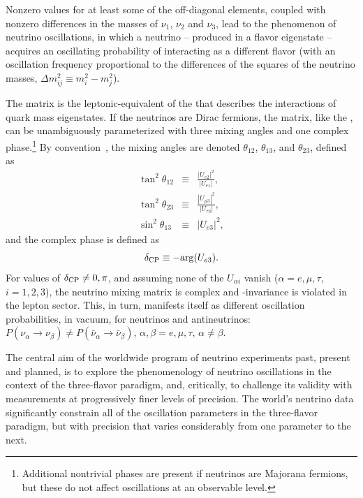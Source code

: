 Nonzero values for at least some of the off-diagonal elements, coupled with nonzero 
differences in the masses of $\nu_1$, $\nu_2$ and $\nu_3$, lead to the phenomenon of 
neutrino oscillations, in which a neutrino -- %
produced in a  
flavor eigenstate -- acquires an oscillating probability 
of interacting as a different flavor (with an oscillation frequency proportional to 
the differences of the squares of the neutrino masses, $\Delta m^2_{ij}\equiv m_i^2-m_j^2$). %


The  matrix is the leptonic-equivalent of the  %
that describes the  interactions of quark mass 
eigenstates. If the neutrinos are Dirac fermions, the  matrix, 
like the , can be unambiguously parameterized with three mixing 
angles and one complex phase.\footnote{Additional nontrivial phases are present 
if neutrinos are Majorana fermions, but these do not affect oscillations at 
an observable level.} By convention~\cite{Tanabashi:2018oca}, the mixing angles 
are denoted $\theta_{12}$, $\theta_{13}$, and $\theta_{23}$, defined as
\begin{eqnarray}
\tan^2\theta_{12} &\equiv& \frac{|U_{e2}|^2}{|U_{e1}|}, \\
\tan^2\theta_{23} &\equiv& \frac{|U_{\mu3}|^2}{|U_{\tau3}|}, \\
\sin^2\theta_{13} &\equiv& |U_{e3}|^2,
\end{eqnarray} 
and the complex phase \deltacp is defined as
\begin{equation}
\delta_{\rm CP} \equiv -{\rm arg}(U_{e3}).
\end{equation}
For values of $\delta_{\rm CP}\neq 0,\pi$, and assuming none of the $U_{\alpha i}$ 
vanish ($\alpha=e,\mu,\tau$, $i=1,2,3$), the neutrino mixing matrix is complex 
and -invariance is violated in the lepton sector. This, in turn, manifests 
itself as different oscillation probabilities, in vacuum, for neutrinos 
and antineutrinos: $P(\nu_{\alpha}\to\nu_{\beta})\neq 
P(\bar{\nu}_{\alpha}\to\bar{\nu}_{\beta})$, $\alpha,\beta=e,\mu,\tau$, $\alpha\neq\beta$.

The central aim of the worldwide program of %
neutrino experiments past, present and planned, is to explore 
the phenomenology of neutrino oscillations in the context of the 
three-flavor paradigm, and, critically, 
to challenge its validity with measurements at progressively 
finer levels of precision.  The world's neutrino data significantly constrain 
all of the oscillation parameters in the three-flavor paradigm, but 
with precision that varies considerably from one parameter to the next.

